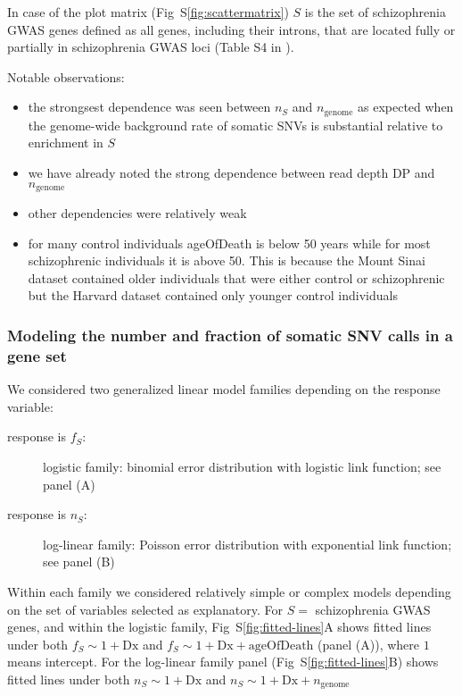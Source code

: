 \documentclass[letterpaper]{article}
\begin{document}
In case of the plot matrix (Fig~S\ref{fig:scattermatrix}) \(S\) is the set of schizophrenia GWAS genes
defined as all genes, including their introns, that are located fully or
partially in schizophrenia GWAS loci (Table S4 in \cite{Pardinas2018}).

Notable observations:
\begin{itemize}
	\item the strongsest dependence was seen between \(n_S\) and \(n_\mathrm{genome}\) as expected
		when the genome-wide background rate of somatic SNVs is
		substantial relative to enrichment in \(S\)
	\item we have already noted the strong dependence between read depth DP and
		\(n_\mathrm{genome}\)
        \item other dependencies were relatively weak
	\item for many control individuals ageOfDeath is below 50 years while for
		most schizophrenic individuals it is above 50.  This is
		because the Mount Sinai dataset contained older individuals
		that were either control or schizophrenic but the Harvard dataset contained
		only younger control individuals
\end{itemize}

\subsubsection*{Modeling the number and fraction of somatic SNV calls in a gene set}

We considered two generalized linear model families depending on the response
variable:
\begin{description}
\item[response is \(f_S\):] logistic family: binomial error distribution with
	logistic link function; see panel (A)
\item[response is \(n_S\):] log-linear family: Poisson error distribution with exponential link function; see panel (B)
\end{description}

Within each family we considered relatively simple or complex models depending
on the set of variables selected as explanatory.  For \(S =\) schizophrenia
GWAS genes, and within the
logistic family, Fig~S\ref{fig:fitted-lines}A shows fitted lines under both \(f_S \sim 1 +
	\mathrm{Dx}\) and \(f_S \sim 1 + \mathrm{Dx} + \mathrm{ageOfDeath}\)
(panel (A)), where \(1\) means intercept.  For the log-linear family panel
(Fig~S\ref{fig:fitted-lines}B)
shows fitted lines under both \(n_S \sim 1 + \mathrm{Dx}\) and \(n_S \sim 1 +
	\mathrm{Dx} + n_\mathrm{genome}\)
\end{document}
